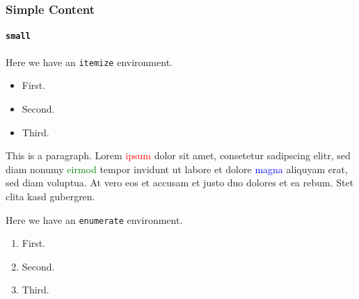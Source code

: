 	\begin{framefont}{\small}
	\begin{frame}
		\frametitle{Simple Content}
		\framesubtitle{\texttt{small}}
		Here we have an \texttt{itemize} environment.
		\begin{itemize}
			\item First.
			\item Second.
			\item Third.
		\end{itemize}
		\vspace{1em}

		This is a paragraph. Lorem \textcolor{red}{ipsum} dolor sit amet, consetetur sadipscing elitr, sed diam nonumy \textcolor{green}{eirmod} tempor invidunt ut labore et dolore \textcolor{blue}{magna} aliquyam erat, sed diam voluptua. At vero eos et accusam et justo duo dolores et ea rebum. Stet clita kasd gubergren.
		\vspace{1em}

		Here we have an \texttt{enumerate} environment.
		\begin{enumerate}
			\item First.
			\item Second.
			\item Third.
		\end{enumerate}
	\end{frame}
	\end{framefont}

